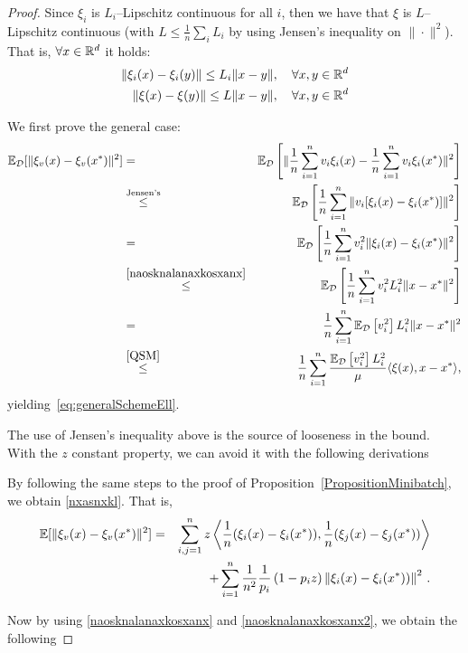 \documentclass{article}
\begin{document}
\begin{proof}
Since $\xi_i$ is $L_i$--Lipschitz continuous for all $i$, then we have that $\xi$ is $L$--Lipschitz continuous (with $L \leq \frac{1}{n} \sum_i L_i$ by using Jensen's inequality on $\|\cdot\|^2$). That is, $ \forall x \in \mathbb{R}^d$ it holds:
\begin{align}
\label{naosknalanaxkosxanx}
\|\xi_i(x)-\xi_i(y)\| \leq L_i \|x-y\|, \quad \forall x, y \in \mathbb{R}^d\\
\label{naosknalanaxkosxanx2}
\|\xi(x)-\xi(y)\| \leq L \|x-y\|, \quad \forall x, y \in \mathbb{R}^d
\end{align}

We first prove the general case:
\begin{eqnarray*}
	\mathbb{E}_{{\cal D}}[\|\xi_v(x) - \xi_v(x^*)\|^2] &=& 
	\mathbb{E}_{{\cal D}}\left[\|\frac{1}{n}\sum_{i=1}^n v_i \xi_i(x) - \frac{1}{n}\sum_{i=1}^n v_i \xi_i(x^*)\|^2\right]  \\
	&\overset{\text{Jensen's}}{\leq}& \mathbb{E}_{{\cal D}}\left[\frac{1}{n}\sum_{i=1}^n \| v_i [\xi_i(x) - \xi_i(x^*)]\|^2\right] \\
	&=& \mathbb{E}_{{\cal D}}\left[\frac{1}{n}\sum_{i=1}^n v_i^2 \| \xi_i(x) - \xi_i(x^*)\|^2\right] \\
	&\overset{\eqref{naosknalanaxkosxanx}}{\leq}& \mathbb{E}_{{\cal D}}\left[\frac{1}{n}\sum_{i=1}^n v_i^2 L_i^2\| x - x^*\|^2\right] \\
	&=& \frac{1}{n}\sum_{i=1}^n \mathbb{E}_{{\cal D}}\left[v_i^2\right] L_i^2\| x - x^*\|^2\\
	& \overset{\eqref{QSM}}{\leq} &\frac{1}{n}\sum_{i=1}^n  \frac{\mathbb{E}_{{\cal D}}\left[v_i^2\right] L_i^2}{\mu} \langle\xi(x),x-x^*\rangle ,
\end{eqnarray*}
yielding~\eqref{eq:generalSchemeEll}.

The use of Jensen's inequality above is the source of looseness in the bound. With the $z$ constant property, we can avoid it with the following derivations


By following the same steps to the proof of Proposition~\ref{PropositionMinibatch}, we obtain \eqref{nxasnxkl}. That is,
\begin{eqnarray*}
\mathbb{E}[\|\xi_v(x) - \xi_v(x^*)\|^2] 
&= &  \sum_{i,j=1}^n z \left\langle \frac{1}{n}(\xi_i(x) - \xi_i(x^*)), \frac{1}{n}(\xi_j(x) - \xi_j(x^*)) \right\rangle \notag\\
& &+ \sum_{i=1}^n\frac{1}{n^2} \frac{1}{p_i}\left(1 -p_i z \right) \left\| \xi_i(x) - \xi_i(x^*))\right\|^2 \, .
\end{eqnarray*}

Now by using \eqref{naosknalanaxkosxanx} and \eqref{naosknalanaxkosxanx2},  we obtain the following


\end{proof}
\end{document}
